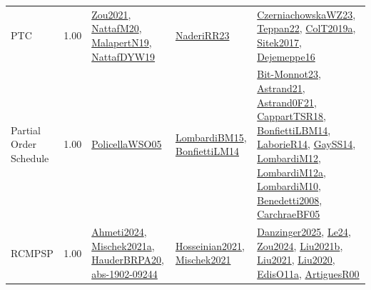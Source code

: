 {\begin{longtable}{p{3cm}r>{\raggedright\arraybackslash}p{6cm}>{\raggedright\arraybackslash}p{6cm}>{\raggedright\arraybackslash}p{8cm}}
\index{PTC}\index{Classification!PTC}PTC &  1.00 & \hyperref[detail:Zou2021]{Zou2021}, \hyperref[detail:NattafM20]{NattafM20}, \hyperref[detail:MalapertN19]{MalapertN19}, \hyperref[detail:NattafDYW19]{NattafDYW19} & \hyperref[detail:NaderiRR23]{NaderiRR23} & \hyperref[detail:CzerniachowskaWZ23]{CzerniachowskaWZ23}, \hyperref[detail:Teppan22]{Teppan22}, \hyperref[detail:ColT2019a]{ColT2019a}, \hyperref[detail:Sitek2017]{Sitek2017}, \hyperref[detail:Dejemeppe16]{Dejemeppe16}\\
\index{Partial Order Schedule}\index{Classification!Partial Order Schedule}Partial Order Schedule &  1.00 & \hyperref[detail:PolicellaWSO05]{PolicellaWSO05} & \hyperref[detail:LombardiBM15]{LombardiBM15}, \hyperref[detail:BonfiettiLM14]{BonfiettiLM14} & \hyperref[detail:Bit-Monnot23]{Bit-Monnot23}, \hyperref[detail:Astrand21]{Astrand21}, \hyperref[detail:Astrand0F21]{Astrand0F21}, \hyperref[detail:CappartTSR18]{CappartTSR18}, \hyperref[detail:BonfiettiLBM14]{BonfiettiLBM14}, \hyperref[detail:LaborieR14]{LaborieR14}, \hyperref[detail:GaySS14]{GaySS14}, \hyperref[detail:LombardiM12]{LombardiM12}, \hyperref[detail:LombardiM12a]{LombardiM12a}, \hyperref[detail:LombardiM10]{LombardiM10}, \hyperref[detail:Benedetti2008]{Benedetti2008}, \hyperref[detail:CarchraeBF05]{CarchraeBF05}\\
\index{RCMPSP}\index{Classification!RCMPSP}RCMPSP &  1.00 & \hyperref[detail:Ahmeti2024]{Ahmeti2024}, \hyperref[detail:Mischek2021a]{Mischek2021a}, \hyperref[detail:HauderBRPA20]{HauderBRPA20}, \hyperref[detail:abs-1902-09244]{abs-1902-09244} & \hyperref[detail:Hosseinian2021]{Hosseinian2021}, \hyperref[detail:Mischek2021]{Mischek2021} & \hyperref[detail:Danzinger2025]{Danzinger2025}, \hyperref[detail:Le24]{Le24}, \hyperref[detail:Zou2024]{Zou2024}, \hyperref[detail:Liu2021b]{Liu2021b}, \hyperref[detail:Liu2021]{Liu2021}, \hyperref[detail:Liu2020]{Liu2020}, \hyperref[detail:EdisO11a]{EdisO11a}, \hyperref[detail:ArtiguesR00]{ArtiguesR00}\\

\end{longtable}}
